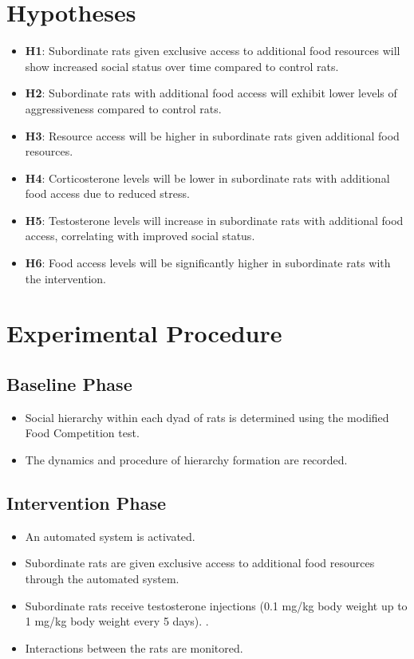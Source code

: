 \documentclass[english, a4paper, 11pt]{article}
\begin{document}
\section*{Hypotheses}

\begin{itemize}
    \item \textbf{H1}: Subordinate rats given exclusive access to additional food resources will show increased social status over time compared to control rats.
    \item \textbf{H2}: Subordinate rats with additional food access will exhibit lower levels of aggressiveness compared to control rats.
    \item \textbf{H3}: Resource access will be higher in subordinate rats given additional food resources.
    \item \textbf{H4}: Corticosterone levels will be lower in subordinate rats with additional food access due to reduced stress.
    \item \textbf{H5}: Testosterone levels will increase in subordinate rats with additional food access, correlating with improved social status.
    \item \textbf{H6}: Food access levels will be significantly higher in subordinate rats with the intervention.
\end{itemize}

\section*{Experimental Procedure}

\subsection*{Baseline Phase}
\begin{itemize}
    \item Social hierarchy within each dyad of rats is determined using the modified Food Competition test.
    \item The dynamics and procedure of hierarchy formation are recorded.
\end{itemize}

\subsection*{Intervention Phase}
\begin{itemize}
    \item An automated system is activated.
    \item Subordinate rats are given exclusive access to additional food resources through the automated system.
    \item Subordinate rats receive testosterone injections (0.1 mg/kg body weight up to 1 mg/kg body weight every 5 days). .
    \item Interactions between the rats are monitored.
\end{itemize}
\end{document}
